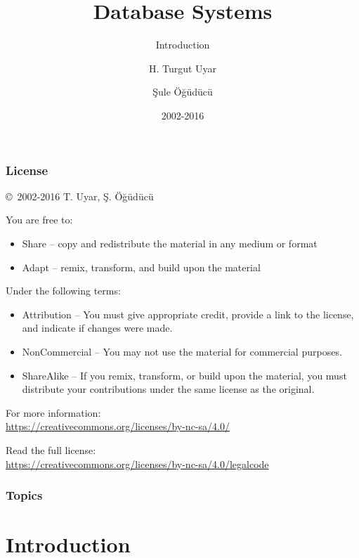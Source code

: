 \documentclass[dvipsnames]{beamer}
\title{Database Systems}
\subtitle{Introduction}
\author{H. Turgut Uyar \and Şule Öğüdücü}
\date{2002-2016}
\theoremstyle{plain}
\begin{document}
\begin{frame}
  \titlepage
\end{frame}

\begin{frame}
  \frametitle{License}

  \hfill
  \copyright~2002-2016 T. Uyar, Ş. Öğüdücü

  \vfill
  \begin{footnotesize}
    You are free to:
    \begin{itemize}
      \itemsep0em
      \item Share -- copy and redistribute the material in any medium or format
      \item Adapt -- remix, transform, and build upon the material
    \end{itemize}

    Under the following terms:
    \begin{itemize}
      \itemsep0em
      \item Attribution -- You must give appropriate credit, provide a link to
        the license, and indicate if changes were made.

      \item NonCommercial -- You may not use the material for commercial
        purposes.

      \item ShareAlike -- If you remix, transform, or build upon the material,
        you must distribute your contributions under the same license as the
        original.
    \end{itemize}
  \end{footnotesize}

  \begin{small}
    For more information:\\
    \url{https://creativecommons.org/licenses/by-nc-sa/4.0/}

    \smallskip
    Read the full license:\\
    \url{https://creativecommons.org/licenses/by-nc-sa/4.0/legalcode}
  \end{small}
\end{frame}

\begin{frame}
  \frametitle{Topics}
  \tableofcontents
\end{frame}

\section{Introduction}
\end{document}
